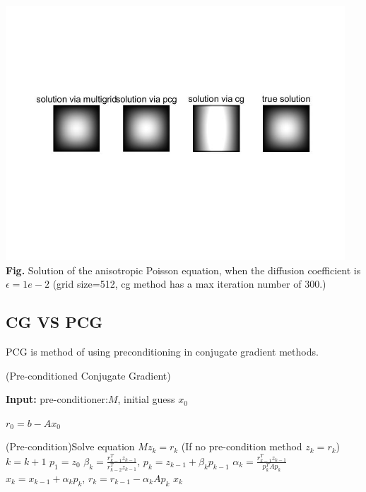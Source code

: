 \documentclass[12pt]{amsart}
\begin{document}
\begin{center}
	\includegraphics[width=5in]{solu.jpg}\\
	\textbf{Fig.} Solution of the anisotropic Poisson equation, when the diffusion coefficient is $\epsilon=1e-2$ (grid size=512, cg method has a max iteration number of 300.)
\end{center}



\subsection{CG VS PCG}

PCG is method of using preconditioning in conjugate gradient methods.


\begin{algorithm}[h]
	\caption{(Pre-conditioned Conjugate Gradient)} 
	\hspace*{0.02in} {\bf Input:} 
	pre-conditioner:$M$, initial guess $x_0$\\
	\begin{algorithmic}[1]
		\State $r_0=b-Ax_0$ 

		

		\State (Pre-condition)Solve equation $Mz_k=r_k$ (If no pre-condition method $z_k=r_k$)
		\State $k=k+1$
		\State $p_1=z_0$
		\Else
		\State $\beta_k=\frac{r_{k-1}^Tz_{k-1}}{r_{k-2}^Tz_{k-1}}$, $p_k=z_{k-1}+\beta_kp_{k-1}$
		\EndIf
		\State $\alpha_k=\frac{r_{k-1}^Tz_{k-1}}{p_k^TAp_k}$
		\State $x_k=x_{k-1}+\alpha_kp_k$, $r_k=r_{k-1}-\alpha_kAp_k$
		\EndWhile
		\State \Return $x_k$
	\end{algorithmic}
\end{algorithm}
\end{document}
